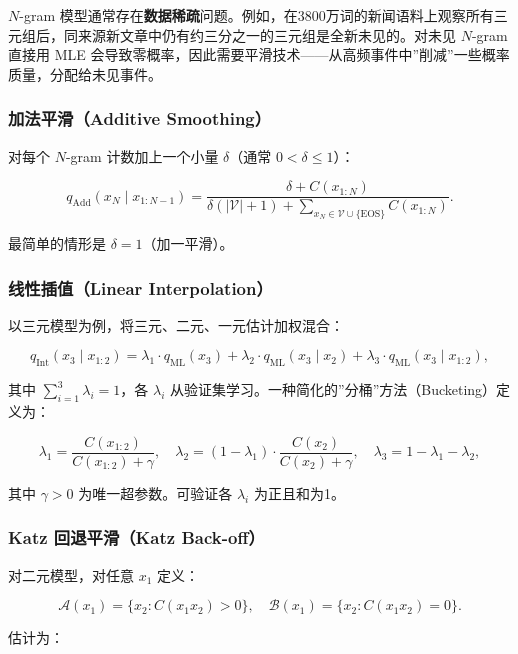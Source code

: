 \documentclass[
  11pt,
  a4paper,
]{article}
\begin{document}
\(N\)-gram
模型通常存在\textbf{数据稀疏}问题。例如，在3800万词的新闻语料上观察所有三元组后，同来源新文章中仍有约三分之一的三元组是全新未见的。对未见
\(N\)-gram 直接用 MLE
会导致零概率，因此需要平滑技术------从高频事件中''削减''一些概率质量，分配给未见事件。

\subsubsection{加法平滑（Additive
Smoothing）}\label{ux52a0ux6cd5ux5e73ux6ed1additive-smoothing}

对每个 \(N\)-gram 计数加上一个小量 \(\delta\)（通常
\(0 < \delta \leq 1\)）：

\[q_{\text{Add}}(x_N \mid x_{1:N-1}) = \frac{\delta + C(x_{1:N})}{\delta(|\mathcal{V}|+1) + \sum_{x_N \in \mathcal{V} \cup \{\text{EOS}\}} C(x_{1:N})}.\]

最简单的情形是 \(\delta = 1\)（加一平滑）。

\subsubsection{线性插值（Linear
Interpolation）}\label{ux7ebfux6027ux63d2ux503clinear-interpolation}

以三元模型为例，将三元、二元、一元估计加权混合：

\[q_{\text{Int}}(x_3 \mid x_{1:2}) = \lambda_1 \cdot q_{\text{ML}}(x_3) + \lambda_2 \cdot q_{\text{ML}}(x_3 \mid x_2) + \lambda_3 \cdot q_{\text{ML}}(x_3 \mid x_{1:2}),\]

其中 \(\sum_{i=1}^3 \lambda_i = 1\)，各 \(\lambda_i\)
从验证集学习。一种简化的''分桶''方法（Bucketing）定义为：

\[\lambda_1 = \frac{C(x_{1:2})}{C(x_{1:2}) + \gamma}, \quad \lambda_2 = (1 - \lambda_1) \cdot \frac{C(x_2)}{C(x_2) + \gamma}, \quad \lambda_3 = 1 - \lambda_1 - \lambda_2,\]

其中 \(\gamma > 0\) 为唯一超参数。可验证各 \(\lambda_i\) 为正且和为1。

\subsubsection{Katz 回退平滑（Katz
Back-off）}\label{katz-ux56deux9000ux5e73ux6ed1katz-back-off}

对二元模型，对任意 \(x_1\) 定义：

\[\mathcal{A}(x_1) = \{x_2: C(x_1 x_2) > 0\}, \quad \mathcal{B}(x_1) = \{x_2: C(x_1 x_2) = 0\}.\]

估计为：
\end{document}
